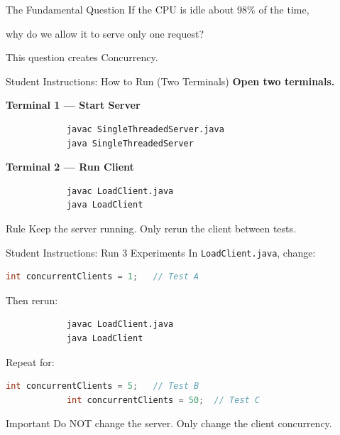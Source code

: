 \documentclass[11pt]{beamer}
\begin{document}
	\begin{frame}{The Fundamental Question}
		\Large
		If the CPU is idle about 98\% of the time,\par

		why do we allow it to serve only one request?\par
		

		\vspace{4mm}
		\begin{alertblock}{This question creates Concurrency.}
		\end{alertblock}
	\end{frame}
	\begin{frame}[fragile]{Student Instructions: How to Run (Two Terminals)}
		\textbf{Open two terminals.}
		
		\vspace{2mm}
		\textbf{Terminal 1 --- Start Server}
		\begin{lstlisting}
			javac SingleThreadedServer.java
			java SingleThreadedServer
		\end{lstlisting}
		

		\textbf{Terminal 2 --- Run Client}
		\begin{lstlisting}
			javac LoadClient.java
			java LoadClient
		\end{lstlisting}
		

		\begin{block}{Rule}
			Keep the server running. Only rerun the client between tests.
		\end{block}
	\end{frame}
	
	\begin{frame}[fragile]{Student Instructions: Run 3 Experiments}
		In \texttt{LoadClient.java}, change:
		
		\begin{lstlisting}[language=Java]
			int concurrentClients = 1;   // Test A
		\end{lstlisting}
		

		Then rerun:
		\begin{lstlisting}
			javac LoadClient.java
			java LoadClient
		\end{lstlisting}
		

		Repeat for:
		\begin{lstlisting}[language=Java]
			int concurrentClients = 5;   // Test B
			int concurrentClients = 50;  // Test C
		\end{lstlisting}
		

		\begin{alertblock}{Important}
			Do NOT change the server. Only change the client concurrency.
		\end{alertblock}
	\end{frame}
	
\end{document}
